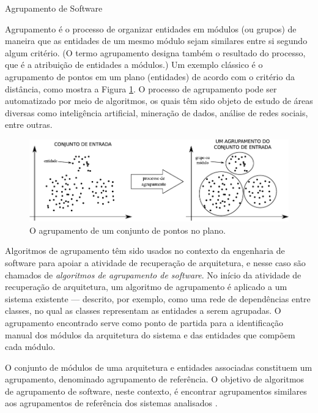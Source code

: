 \begin{section}{Agrupamento de Software}
	
Agrupamento é o processo de organizar entidades em módulos (ou grupos) de maneira que as entidades de um mesmo módulo sejam similares entre si segundo algum critério. (O termo agrupamento designa também o resultado do processo, que é a atribuição de entidades a módulos.) Um exemplo clássico é o agrupamento de pontos em um plano (entidades) de acordo com o critério da distância, como mostra a Figura \ref{fig:agrupamento}. O processo de agrupamento pode ser automatizado por meio de algoritmos, os quais têm sido objeto de estudo de áreas diversas como inteligência artificial, mineração de dados, análise de redes sociais, entre outras.

\begin{figure}[htbp]
	\centering
		\includegraphics[scale=1]{figuras/agrupamento}
	\caption{O agrupamento de um conjunto de pontos no plano.}
	\label{fig:agrupamento}
\end{figure}

Algoritmos de agrupamento têm sido usados no contexto da engenharia de software para apoiar a atividade de recuperação de arquitetura, e nesse caso são chamados de \emph{algoritmos de agrupamento de software}. No início da atividade de recuperação de arquitetura, um algoritmo de agrupamento é aplicado a um sistema existente --- descrito, por exemplo, como uma rede de dependências entre classes, no qual as classes representam as entidades a serem agrupadas. O agrupamento encontrado serve como ponto de partida para a identificação manual dos módulos da arquitetura do sistema e das entidades que compõem cada módulo. 

O conjunto de módulos de uma arquitetura e entidades associadas constituem um agrupamento, denominado agrupamento de referência. O objetivo de algoritmos de agrupamento de software, neste contexto, é encontrar agrupamentos similares aos agrupamentos de referência dos sistemas analisados \cite{Koschke2000}.


\end{section}
